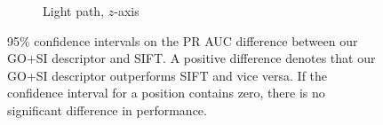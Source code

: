 \documentclass[thesis.tex]{subfiles}
\begin{document}
\begin{figure}[tb]
{\begin{subfigure}[t]{0.5618\textwidth}
		\caption{Light path, $z$-axis}
		\label{fig:dtuResultsStatszAxis}
	\end{subfigure}
	}
	\caption{95\% confidence intervals on the PR AUC difference between our GO+SI descriptor and SIFT. A positive difference denotes that our GO+SI descriptor outperforms SIFT and vice versa. If the confidence interval for a position contains zero, there is no significant difference in performance.}
	\label{fig:dtuResultsStats}
\end{figure}
%
%
\subbibliography
\end{document}
